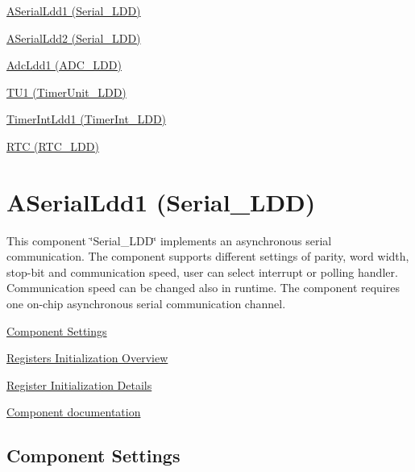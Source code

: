 
\begin{DoxyItemize}
\item \hyperlink{ASerialLdd1}{A\+Serial\+Ldd1 (Serial\+\_\+\+L\+DD)}
\item \hyperlink{ASerialLdd2}{A\+Serial\+Ldd2 (Serial\+\_\+\+L\+DD)}
\item \hyperlink{AdcLdd1}{Adc\+Ldd1 (A\+D\+C\+\_\+\+L\+DD)}
\item \hyperlink{TU1}{T\+U1 (Timer\+Unit\+\_\+\+L\+DD)}
\item \hyperlink{TimerIntLdd1}{Timer\+Int\+Ldd1 (Timer\+Int\+\_\+\+L\+DD)}
\item \hyperlink{RTC}{R\+TC (R\+T\+C\+\_\+\+L\+DD)} 
\end{DoxyItemize}\hypertarget{ASerialLdd1}{}\section{A\+Serial\+Ldd1 (Serial\+\_\+\+L\+DD)}\label{ASerialLdd1}
This component \char`\"{}\+Serial\+\_\+\+L\+D\+D\char`\"{} implements an asynchronous serial communication. The component supports different settings of parity, word width, stop-\/bit and communication speed, user can select interrupt or polling handler. Communication speed can be changed also in runtime. The component requires one on-\/chip asynchronous serial communication channel.


\begin{DoxyItemize}
\item \hyperlink{ASerialLdd1_settings}{Component Settings}
\item \hyperlink{ASerialLdd1_regs_overview}{Registers Initialization Overview}
\item \hyperlink{ASerialLdd1_regs_details}{Register Initialization Details}
\item \hyperlink{group___a_serial_ldd1__module}{Component documentation} 
\end{DoxyItemize}\hypertarget{ASerialLdd1_settings}{}\subsection{Component Settings}\label{ASerialLdd1_settings}

